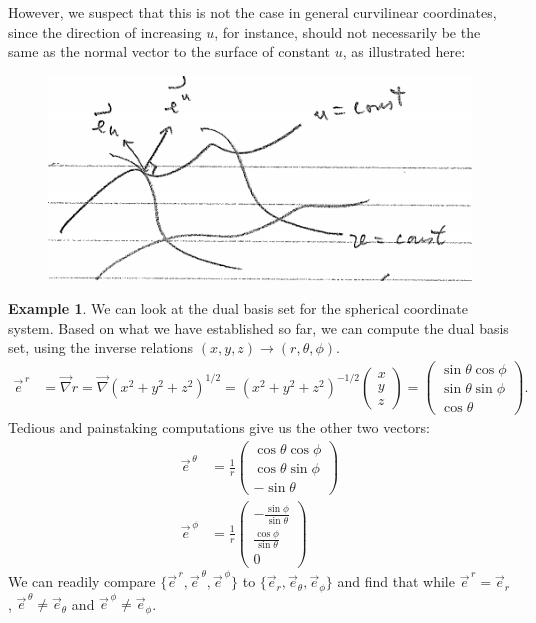 \documentclass{book}
\theoremstyle{definition}
\newtheorem{exmp}{Example}[section]
\begin{document}
However, we suspect that this is not the case in general curvilinear coordinates, since the direction of increasing $u$, for instance, should not necessarily be the same as the normal vector to the surface of constant $u$, as illustrated here:
\begin{figure}[!htb]
	\centering
	\includegraphics[scale=0.6]{curvi}
\end{figure}
\begin{exmp}
We can look at the dual basis set for the spherical coordinate system. Based on what we have established so far, we can compute the dual basis set, using the inverse relations $(x,y,z) \rightarrow (r,\theta,\phi)$.
\begin{align*}
\vec{e}^{\,r} &= \vec{\nabla}r = \vec{\nabla}(x^2+y^2+z^2)^{1/2} = (x^2+y^2+z^2)^{-1/2}\begin{pmatrix}x\\y\\z\end{pmatrix} = \begin{pmatrix}\sin\theta\cos\phi\\ \sin\theta\sin\phi\\ \cos\theta\end{pmatrix}.
\end{align*}
Tedious and painstaking computations give us the other two vectors:
\begin{align*}
\vec{e}^{\,\theta} &= \frac{1}{r}\begin{pmatrix} \cos\theta\cos\phi \\ \cos\theta\sin\phi \\ -\sin\theta \end{pmatrix}\\
\vec{e}^{\,\phi} &= \frac{1}{r}\begin{pmatrix} -\frac{\sin\phi}{\sin\theta} \\ \frac{\cos\phi}{\sin\theta} \\ 0\end{pmatrix}
\end{align*}
We can readily compare $\{ \vec{e}^{\,r}, \vec{e}^{\,\theta}, \vec{e}^{\,\phi} \}$ to $\{ \vec{e}_{r}, \vec{e}_\theta, \vec{e}_\phi \}$ and find that while $\vec{e}^{\,r} = \vec{e}_{r}$, $\vec{e}^{\,\theta} \neq \vec{e}_{\theta}$ and $\vec{e}^{\,\phi} \neq \vec{e}_{\phi}$.
\end{exmp}
\end{document}
